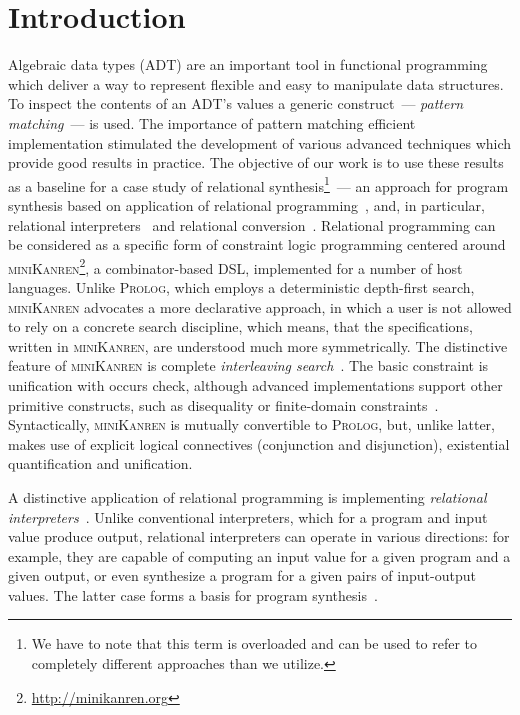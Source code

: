 \section{Introduction}
\label{sec:intro}

Algebraic data types (ADT) are an important tool in functional programming which deliver a way to represent flexible and easy to manipulate data structures.
To inspect the contents of an ADT's values a generic construct~--- \emph{pattern matching}~--- is used. The importance of pattern matching efficient
implementation stimulated the development of various advanced techniques which provide good results in practice. The objective of our work is to use these
results as a baseline for a case study of relational synthesis\footnote{We have to note that this term is overloaded and can be used to refer to completely
different approaches than we utilize.}~--- an approach for program synthesis based on application of relational programming~\cite{TRS,WillThesis}, and,
in particular, relational interpreters~\cite{unified} and relational conversion~\cite{conversion}. Relational programming can be considered as a specific form
of constraint logic programming centered around \textsc{miniKanren}\footnote{\url{http://minikanren.org}}, a combinator-based DSL, implemented for a number of host languages.
Unlike \textsc{Prolog}, which employs a deterministic depth-first search, \textsc{miniKanren} advocates a 
more
declarative approach, in which a user is not
allowed to rely on a concrete search discipline, which means, that the specifications, written in \textsc{miniKanren}, are understood much more symmetrically.
The distinctive feature of \textsc{miniKanren} is complete \emph{interleaving search}~\cite{search}. The basic constraint is unification with occurs check, although
advanced implementations support other primitive constructs, such as disequality or finite-domain constraints~\cite{CKanren}. Syntactically, \textsc{miniKanren} is mutually
convertible to \textsc{Prolog}, but, unlike latter, makes use of explicit logical connectives (conjunction and disjunction), existential quantification and unification.
 
A distinctive application of relational programming is implementing \emph{relational interpreters}~\cite{Untagged}. Unlike conventional interpreters, which for a program and
input value produce output, relational interpreters can operate in various directions: for example, they are capable of computing an input value for a given
program and a given output, or even synthesize a program for a given pairs of input-output values. The latter case forms a basis for program synthesis~\cite{eigen,unified}.


